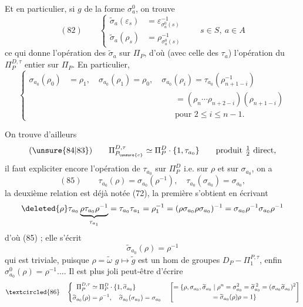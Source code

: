 Et en particulier, si $g$ de la forme $\sigma_a^0$, on trouve
\[
(82)\qquad
\left\{
\begin{aligned}
\widetilde\sigma_a(\varepsilon_s)&=\varepsilon_{\sigma_a^0(s)}^{-1}\\
\widetilde\sigma_a(\rho_s)&=\rho_{\sigma_a^0(s)}^{-1}
\end{aligned}
\right.
\qquad s\in S,\ a\in A
\]
ce qui donne l'opération des $\widetilde\sigma_a$ sur $\Pi_P$,  d'où   (avec celle des $\tau_a$) l'opération du $\Pi_P^{D,\tau}$ entier sur $\Pi_P$.  En particulier,
\[
\left\{
\begin{aligned}
\sigma_{a_0}(\rho_0)&=\rho_1,\quad
\sigma_{a_0}(\rho_1)=\rho_0,\quad
\sigma_{a_0}(\rho_i)=\tau_{a_0}(\rho_{n+1-i}^{-1})\\
&\hspace{13em}=(\rho_n\cdots\rho_{n+2-i})(\rho_{n+1-i})\\
&\hspace{13em}\text{pour }2\leq i\leq n-1.
\end{aligned}
\right.
\]

 On trouve d'ailleurs 
\[
(\unsure{84|83})\qquad
\Pi_{P_{\unsure{c}}}^{D,\tau}\simeq\Pi_P^D\cdot\{1,\tau_{a_0}\}
\qquad\text{produit }\tfrac12\text{ direct},
\]
il faut expliciter encore l'opération de $\tau_{a_0}$ sur $\Pi_P^D$ i.e. sur $\rho$ et sur $\sigma_{a_0}$, on a
\[
(85)\qquad
\tau_{a_0}(\rho)=\sigma_{a_0}(\rho^{-1}),\quad
\tau_{a_0}(\sigma_{a_0})=\sigma_{a_0},
\]
la deuxième relation est déjà notée (72), la première s'obtient en écrivant
\[
\deleted{\rho}\tau_{a_0}
\underbrace{\rho\tau_{a_0}\rho^{-1}}_{\tau_{a_1}}
=\tau_{a_0}\tau_{a_1}
=\rho_1^{-1}
=(\rho\sigma_{a_0}\rho\sigma_{a_0})^{-1}
=\sigma_{a_0}\rho^{-1}\sigma_{a_0}\rho^{-1}
\]
d'où (85) ;  elle s'écrit
\[
\widetilde\sigma_{a_0}(\rho)=\rho^{-1}
\]
qui est triviale, puisque  $\rho=\widetilde\omega$  $g\mapsto\widetilde g$ est un hom de groupes $D_P\mathbin{-}\Pi_1^{P,\tau}$, enfin $\sigma_{a_0}^0(\rho)=\rho^{-1}\ldots$.
Il est plus joli peut-être d'écrire
\[
\textcircled{86}\quad
\left\{
\begin{aligned}
\Pi_P^{D,\tau}&\simeq\Pi_P^D\cdot\{1,\widetilde\sigma_{a_0}\}\\
\widetilde\sigma_{a_0}(\rho)&=\rho^{-1},\quad
\widetilde\sigma_{a_0}(\sigma_{a_0})=\sigma_{a_0}
\end{aligned}
\right.
\quad
\left[
\begin{gathered}
=\{\rho,\sigma_{a_0},\widetilde\sigma_{a_0}\mid
\rho^n=\sigma_{a_0}^2=\widetilde\sigma_{a_0}^{\,2}
=(\sigma_{a_0}\widetilde\sigma_{a_0})^2\\
=\widetilde\sigma_{a_0}(\rho)\rho=1\}
\end{gathered}
\right]
\]

